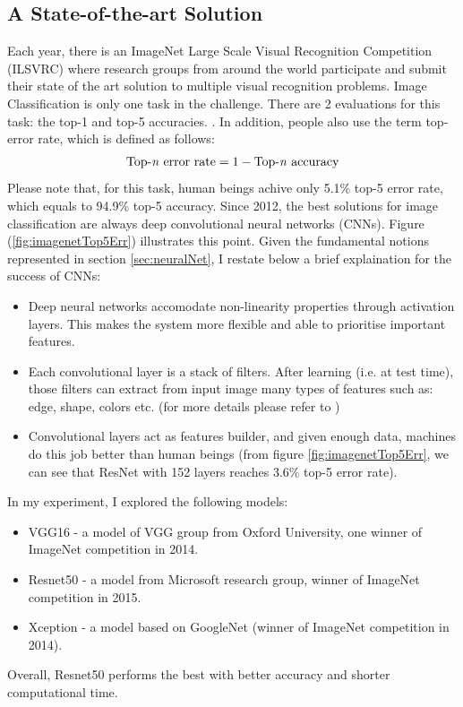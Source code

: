 \subsection{A State-of-the-art Solution}
Each year, there is an ImageNet Large Scale Visual Recognition Competition (ILSVRC) \cite{ILSVRC15} where research groups from around the world participate and submit their state of the art solution to multiple visual recognition problems. Image Classification is only one task in the challenge. There are 2 evaluations for this task: the top-1 and top-5 accuracies. . In addition, people also use the term top- error rate, which is defined as follows: 
$$ \text{Top-\textit{n} error rate} = 1 - \text{Top-\textit{n} accuracy}$$
Please note that, for this task, human beings achive only 5.1\% top-5 error rate, which equals to 94.9\% top-5 accuracy. Since 2012, the best solutions for image classification are always deep convolutional neural networks (CNNs). Figure (\ref{fig:imagenetTop5Err}) illustrates this point. Given the fundamental notions represented in section \ref{sec:neuralNet}, I restate below a brief explaination for the success of CNNs:
\begin{itemize}
	\item Deep neural networks accomodate non-linearity properties through activation layers. This makes the system more flexible and able to prioritise important features.
	\item Each convolutional layer is a stack of filters. After learning (i.e. at test time), those filters can extract from input image many types of features such as: edge, shape, colors etc. (for more details please refer to \cite{DeepVis:2015})
	\item Convolutional layers act as features builder, and given enough data, machines do this job better than human beings (from figure \ref{fig:imagenetTop5Err}, we can see that ResNet with 152 layers reaches 3.6\% top-5 error rate).
\end{itemize}
In my experiment, I explored the following models:
\begin{itemize}
	\item VGG16 \cite{DBLP:journals/corr/SimonyanZ14a} - a model of VGG group from Oxford University, one winner of ImageNet competition in 2014.
	\item Resnet50 \cite{DBLP:journals/corr/HeZRS15} - a model from Microsoft research group, winner of ImageNet competition in 2015.
	\item Xception \cite{DBLP:journals/corr/Chollet16a} - a model based on GoogleNet \cite{DBLP:journals/corr/SzegedyVISW15} (winner of ImageNet competition in 2014).
\end{itemize}
Overall, Resnet50 performs the best with better accuracy and shorter computational time.

